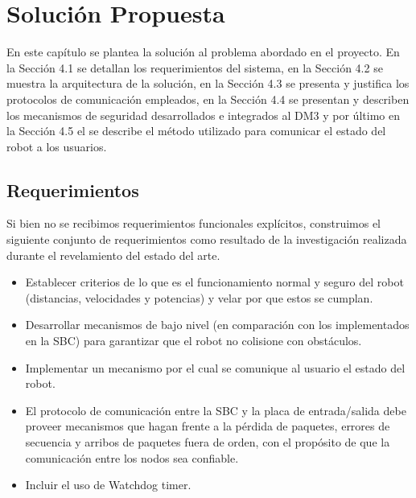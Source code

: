 \documentclass[withindex,glossary]{cam-thesis}
\begin{document}
\chapter{Solución Propuesta}
En este capítulo se plantea la solución al problema abordado en el proyecto. En la Sección 4.1 se detallan los requerimientos del sistema, en la Sección 4.2 se muestra la arquitectura de la solución, en la Sección 4.3 se presenta y justifica los protocolos de comunicación empleados, en la Sección 4.4 se presentan y describen los mecanismos de seguridad desarrollados e integrados al DM3 y por último en la Sección 4.5 el se describe el método utilizado para comunicar el estado del robot a los usuarios.

\section{Requerimientos} \label{sec:Sol Prop :: Requerimientos}
Si bien no se recibimos requerimientos funcionales explícitos, construimos el siguiente conjunto de requerimientos como resultado de la investigación realizada durante el revelamiento del estado del arte.

\begin{itemize}
	\item Establecer criterios de lo que es el funcionamiento normal y seguro del robot (distancias, velocidades y potencias) y velar por que estos se cumplan.
	\item Desarrollar mecanismos de bajo nivel (en comparación con los implementados en la SBC) para garantizar que el robot no colisione con obstáculos.
	\item Implementar un mecanismo por el cual se comunique al usuario el estado del robot.	
	\item El protocolo de comunicación entre la SBC y la placa de entrada/salida debe proveer mecanismos que hagan frente a la pérdida de paquetes, errores de secuencia y arribos de paquetes fuera de orden, con el propósito de que la comunicación entre los nodos sea confiable.
	\item Incluir el uso de Watchdog timer.
\end{itemize}
\end{document}
